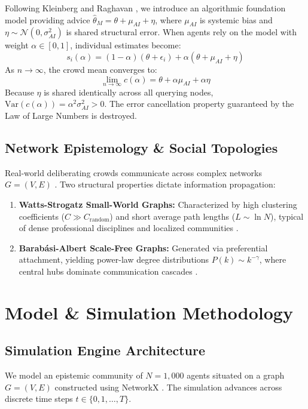 \documentclass[10pt,twocolumn]{article}
\begin{document}
Following Kleinberg and Raghavan \cite{kleinberg2021algorithmic}, we introduce an algorithmic foundation model providing advice $\hat{\theta}_M = \theta + \mu_{AI} + \eta$, where $\mu_{AI}$ is systemic bias and $\eta \sim \mathcal{N}(0, \sigma^2_{AI})$ is shared structural error. When agents rely on the model with weight $\alpha \in [0, 1]$, individual estimates become:
\begin{equation}
s_i(\alpha) = (1 - \alpha)(\theta + \epsilon_i) + \alpha(\theta + \mu_{AI} + \eta)
\end{equation}
As $n \to \infty$, the crowd mean converges to:
\begin{equation}
\lim_{n \to \infty} c(\alpha) = \theta + \alpha \mu_{AI} + \alpha \eta
\end{equation}
Because $\eta$ is shared identically across all querying nodes, $\text{Var}(c(\alpha)) = \alpha^2 \sigma^2_{AI} > 0$. The error cancellation property guaranteed by the Law of Large Numbers is destroyed.

\subsection{Network Epistemology \& Social Topologies}
Real-world deliberating crowds communicate across complex networks $G = (V, E)$ \cite{zollman2007communication}. Two structural properties dictate information propagation:
\begin{enumerate}
    \item \textbf{Watts-Strogatz Small-World Graphs:} Characterized by high clustering coefficients ($C \gg C_{\text{random}}$) and short average path lengths ($L \sim \ln N$), typical of dense professional disciplines and localized communities \cite{watts1998collective}.
    \item \textbf{Barab\'asi-Albert Scale-Free Graphs:} Generated via preferential attachment, yielding power-law degree distributions $P(k) \sim k^{-\gamma}$, where central hubs dominate communication cascades \cite{barabasi1999emergence}.
\end{enumerate}

\section{Model \& Simulation Methodology}

\subsection{Simulation Engine Architecture}
We model an epistemic community of $N = 1,000$ agents situated on a graph $G = (V, E)$ constructed using NetworkX \cite{hagberg2008exploring}. The simulation advances across discrete time steps $t \in \{0, 1, \dots, T\}$.
\end{document}
